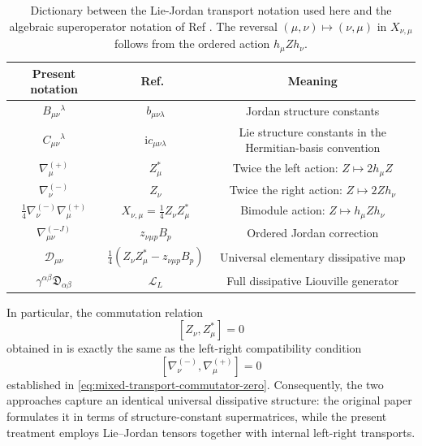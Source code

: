 \documentclass[notitlepage,aip,reprint,onecolumn]{revtex4-1}
\theoremstyle{definition}
\begin{document}
\begin{table}[t]
    \centering
    \small
    \renewcommand{\arraystretch}{1.35}
\begin{tabular}{|c|c|c|}
    \hline
    \textbf{Present notation}
    &
    \textbf{Ref.}~\cite{Bixano:2026qce}
    &
    \textbf{Meaning}
    \\
    \hline
    \(B_{\mu\nu}{}^\lambda\)
    &
    \(b_{\mu\nu\lambda}\)
    &
    Jordan structure constants
    \\
    \hline
    \(C_{\mu\nu}{}^\lambda\)
    &
    \(\mathrm{i} c_{\mu\nu\lambda}\)
    &
    Lie structure constants in the Hermitian-basis convention
    \\
    \hline
    \(\nabla^{(+)}_\mu\)
    &
    \(Z_\mu^*\)
    &
    Twice the left action:
    \(Z\mapsto2h_\mu Z\)
    \\
    \hline
    \(\nabla^{(-)}_\nu\)
    &
    \(Z_\nu\)
    &
    Twice the right action:
    \(Z\mapsto2Zh_\nu\)
    \\
    \hline
    \(\frac14\nabla^{(-)}_\nu\nabla^{(+)}_\mu\)
    &
    \(X_{\nu,\mu}
    =\frac14Z_\nu Z_\mu^*\)
    &
    Bimodule action:
    \(Z\mapsto h_\mu Z h_\nu\)
    \\
    \hline
    \(\nabla^{(-J)}_{\mu\nu}\)
    &
    \(z_{\nu\mu p}B_p\)
    &
    Ordered Jordan correction
    \\
    \hline
    \(\mathcal D_{\mu\nu}\)
    &
    \(\frac14
    \left(
    Z_\nu Z_\mu^*
    -
    z_{\nu\mu p}B_p
    \right)\)
    &
    Universal elementary dissipative map
    \\
    \hline
    \(\gamma^{\alpha\beta}\mathfrak{D}_{\alpha\beta}\)
    &
    \(\mathcal{L}_L\)
    &
    Full dissipative Liouville generator
    \\
    \hline
    \end{tabular}
    \caption{Dictionary between the Lie-Jordan transport notation used here and the algebraic superoperator notation of Ref \cite{Bixano:2026qce}. The reversal \((\mu,\nu)\mapsto(\nu,\mu)\) in \(X_{\nu,\mu}\) follows from the ordered action \(h_\mu Z h_\nu\).}
    \label{tab:Kunold-Bixano-dictionary}
\end{table}

In particular, the commutation relation
\[
    [Z_\nu,Z_\mu^*]
    =
    0
\]
obtained in \cite{Bixano:2026qce} is exactly the same as the left-right compatibility condition
\[
    [\nabla^{(-)}_\nu,\nabla^{(+)}_\mu]
    =
    0
\]
established in \eqref{eq:mixed-transport-commutator-zero}. Consequently, the two approaches capture an identical universal dissipative structure: the original paper formulates it in terms of structure-constant supermatrices, while the present treatment employs Lie–Jordan tensors together with internal left-right transports.
\end{document}
